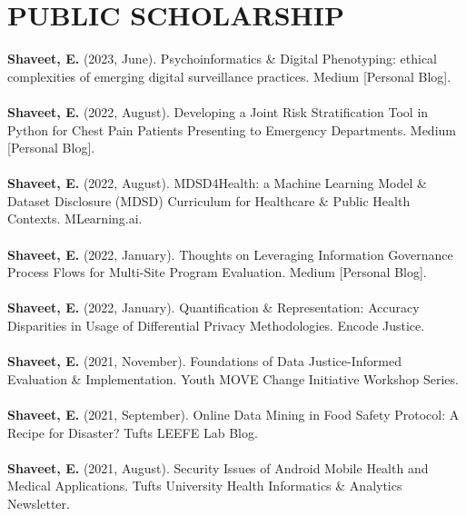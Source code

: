 \documentclass[a4paper,12pt]{article}
\begin{document}
{\section*{PUBLIC SCHOLARSHIP}
\textbf{Shaveet, E.} (2023, June). Psychoinformatics \& Digital Phenotyping: ethical complexities of emerging digital surveillance practices. Medium [Personal Blog].\\
\\
\textbf{Shaveet, E.} (2022, August). Developing a Joint Risk Stratification Tool in Python for Chest Pain Patients Presenting to Emergency Departments. Medium [Personal Blog].\\
\\
\textbf{Shaveet, E.} (2022, August). MDSD4Health: a Machine Learning Model \& Dataset Disclosure (MDSD) Curriculum for Healthcare \& Public Health Contexts. MLearning.ai.\\
\\
\textbf{Shaveet, E.} (2022, January). Thoughts on Leveraging Information Governance Process Flows for Multi-Site Program Evaluation. Medium [Personal Blog].\\
\\
\textbf{Shaveet, E.} (2022, January). Quantification \& Representation: Accuracy Disparities in Usage of Differential Privacy Methodologies. Encode Justice.\\
\\
\textbf{Shaveet, E.} (2021, November). Foundations of Data Justice-Informed Evaluation \& Implementation. Youth MOVE Change Initiative Workshop Series.\\
\\
\textbf{Shaveet, E.} (2021, September). Online Data Mining in Food Safety Protocol: A Recipe for Disaster? Tufts LEEFE Lab Blog.\\
\\
\textbf{Shaveet, E.} (2021, August). Security Issues of Android Mobile Health and Medical Applications. Tufts University Health Informatics \& Analytics Newsletter.\\
}
\end{document}
